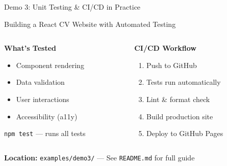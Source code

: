 \documentclass[aspectratio=169]{beamer}
\begin{document}
\begin{frame}[fragile]{Demo 3: Unit Testing \& CI/CD in Practice}
  \centering
  \large\bfseries

  Building a React CV Website with Automated Testing

  \vspace{0.5cm}

  \begin{columns}[T]
    \begin{column}{0.48\textwidth}
      \centering
      \large\bfseries
      \textcolor{conesaTeal}{What's Tested}

      \vspace{0.3cm}
      \normalsize

      \begin{itemize}
        \item Component rendering
        \item Data validation
        \item User interactions
        \item Accessibility (a11y)
      \end{itemize}

      \vspace{0.2cm}
      \small
      \texttt{npm test} --- runs all tests
    \end{column}
    \begin{column}{0.48\textwidth}
      \centering
      \large\bfseries
      \textcolor{conesaOrange}{CI/CD Workflow}

      \vspace{0.3cm}
      \normalsize

      \begin{enumerate}
        \item Push to GitHub
        \item Tests run automatically
        \item Lint \& format check
        \item Build production site
        \item Deploy to GitHub Pages
      \end{enumerate}
    \end{column}
  \end{columns}

  \vspace{0.5cm}
  \centering
  \normalsize
  \textbf{Location:} \texttt{examples/demo3/} --- See \texttt{README.md} for full guide
\end{frame}
\end{document}
